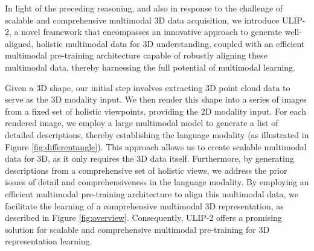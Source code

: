 \documentclass[10pt,twocolumn,letterpaper]{article}
\newcommand{\ning}[1]{\textcolor{blue}{Ning: #1}}
\begin{document}
In light of the preceding reasoning, and also in response to the challenge of scalable and comprehensive multimodal 3D data acquisition, we introduce ULIP-2, a novel framework that encompasses an innovative approach to generate well-aligned, holistic multimodal data for 3D understanding, coupled with an efficient multimodal pre-training architecture capable of robustly aligning these multimodal data, thereby harnessing the full potential of multimodal learning.

Given a 3D shape, our initial step involves extracting 3D point cloud data to serve as the 3D modality input. We then render this shape into a series of images from a fixed set of holistic viewpoints, providing the 2D modality input. For each rendered image, we employ a large multimodal model to generate a list of detailed descriptions, thereby establishing the language modality (as illustrated in Figure \ref{fig:differentangle}). This approach allows us to create scalable multimodal data for 3D, as it only requires the 3D data itself. Furthermore, by generating descriptions from a comprehensive set of holistic views, we address the prior issues of detail and comprehensiveness in the language modality. By employing an efficient multimodal pre-training architecture to align this multimodal data, we facilitate the learning of a comprehensive multimodal 3D representation, as described in Figure \ref{fig:overview}. Consequently, ULIP-2 offers a promising solution for scalable and comprehensive multimodal pre-training for 3D representation learning.

\end{document}
